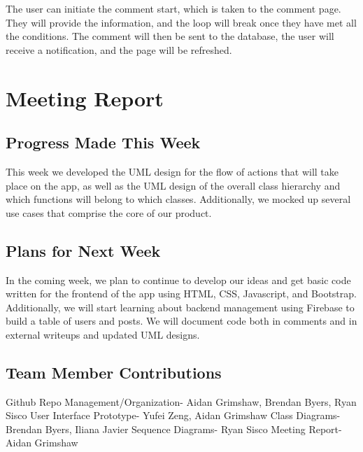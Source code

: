 \documentclass[12pt]{article}
\begin{document}
The user can initiate the comment start, which is taken to the comment page. They will provide the information, and the loop will break once they have met all the conditions. The comment will then be sent to the database, the user will receive a notification, and the page will be refreshed.

\section{Meeting Report}

\subsection{Progress Made This Week}
This week we developed the UML design for the flow of actions that will take place on the app, as well as the UML design of the overall class hierarchy and which functions will belong to which classes. Additionally, we mocked up several use cases that comprise the core of our product.

\subsection{Plans for Next Week}
In the coming week, we plan to continue to develop our ideas and get basic code written for the frontend of the app using HTML, CSS, Javascript, and Bootstrap. Additionally, we will start learning about backend management using Firebase to build a table of users and posts. We will document code both in comments and in external writeups and updated UML designs.

\subsection{Team Member Contributions}
Github Repo Management/Organization- Aidan Grimshaw, Brendan Byers, Ryan Sisco\newline
User Interface Prototype- Yufei Zeng, Aidan Grimshaw\newline
Class Diagrams- Brendan Byers, Iliana Javier\newline
Sequence Diagrams- Ryan Sisco\newline
Meeting Report- Aidan Grimshaw\newline
\end{document}
